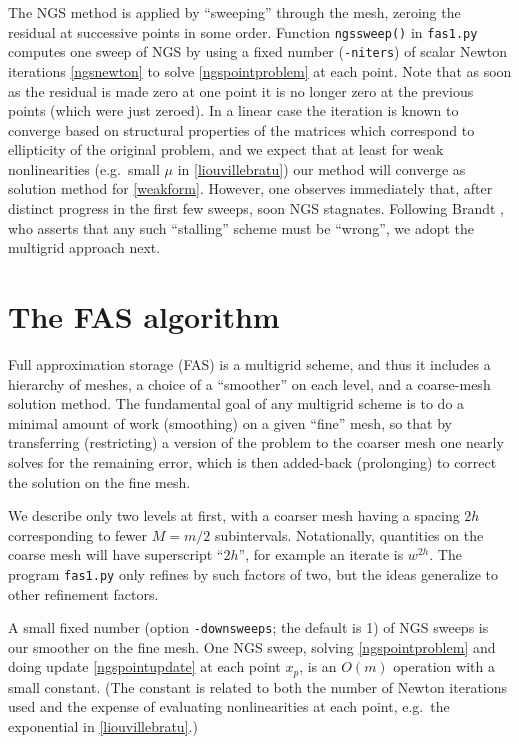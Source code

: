 \documentclass[letterpaper,final,12pt,reqno]{amsart}
\begin{document}
The NGS method is applied by ``sweeping'' through the mesh, zeroing the residual at successive points in some order.  Function \texttt{ngssweep()} in \texttt{fas1.py} computes one sweep of NGS by using a fixed number (\texttt{-niters}) of scalar Newton iterations \eqref{ngsnewton} to solve \eqref{ngspointproblem} at each point.  Note that as soon as the residual is made zero at one point it is no longer zero at the previous points (which were just zeroed).  In a linear case the iteration is known to converge based on structural properties of the matrices \cite[for example]{Greenbaum1997} which correspond to ellipticity of the original problem, and we expect that at least for weak nonlinearities (e.g.~small $\mu$ in \eqref{liouvillebratu}) our method will converge as solution method for \eqref{weakform}.  However, one observes immediately that, after distinct progress in the first few sweeps, soon NGS stagnates.  Following Brandt \cite{Brandt1977}, who asserts that any such ``stalling'' scheme must be ``wrong'', we adopt the multigrid approach next.


\section{The FAS algorithm}

Full approximation storage (FAS) \cite{Brandt1977,Briggsetal2000} is a multigrid scheme, and thus it includes a hierarchy of meshes, a choice of a ``smoother'' on each level, and a coarse-mesh solution method.  The fundamental goal of any multigrid scheme is to do a minimal amount of work (smoothing) on a given ``fine'' mesh, so that by transferring (restricting) a version of the problem to the coarser mesh one nearly solves for the remaining error, which is then added-back (prolonging) to correct the solution on the fine mesh.

We describe only two levels at first, with a coarser mesh having a spacing $2h$ corresponding to fewer $M=m/2$ subintervals.  Notationally, quantities on the coarse mesh will have superscript ``$2h$'', for example an iterate is $w^{2h}$.  The program \texttt{fas1.py} only refines by such factors of two, but the ideas generalize to other refinement factors.

A small fixed number (option \texttt{-downsweeps}; the default is 1) of NGS sweeps is our smoother on the fine mesh.  One NGS sweep, solving \eqref{ngspointproblem} and doing update \eqref{ngspointupdate} at each point $x_p$, is an $O(m)$ operation with a small constant.  (The constant is related to both the number of Newton iterations used and the expense of evaluating nonlinearities at each point, e.g.~the exponential in \eqref{liouvillebratu}.)
\end{document}
